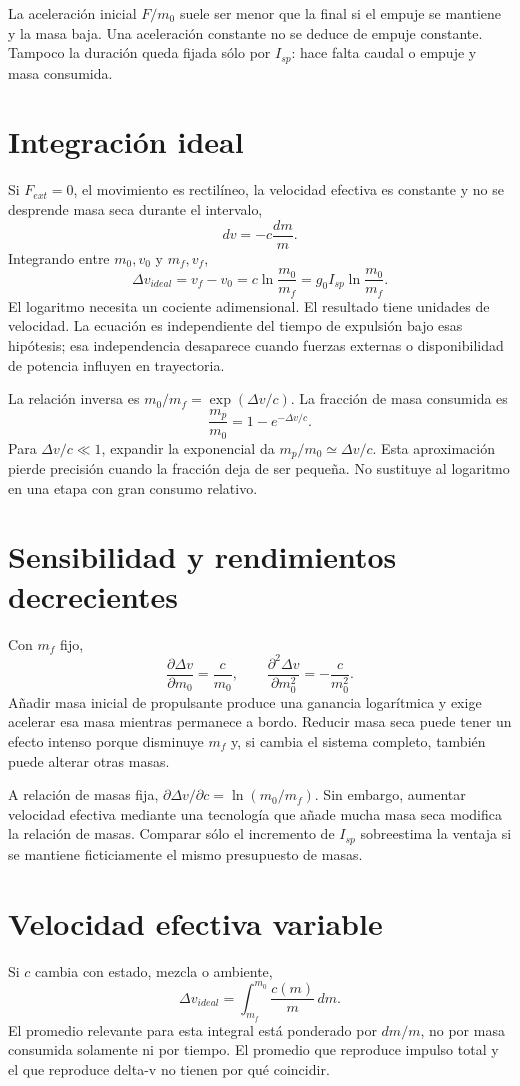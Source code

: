 La aceleración inicial $F/m_0$ suele ser menor que la final si el empuje se mantiene y la masa baja. Una aceleración constante no se deduce de empuje constante. Tampoco la duración queda fijada sólo por $I_{sp}$: hace falta caudal o empuje y masa consumida.
\section{Integración ideal}
Si $F_{ext}=0$, el movimiento es rectilíneo, la velocidad efectiva es constante y no se desprende masa seca durante el intervalo,
\[
 dv=-c\frac{dm}{m}.
\]
Integrando entre $m_0,v_0$ y $m_f,v_f$,
\begin{equation}\label{eq:tsiolkovski}
 \boxed{\Delta v_{ideal}=v_f-v_0=c\ln\frac{m_0}{m_f}
 =g_0I_{sp}\ln\frac{m_0}{m_f}}.
\end{equation}
El logaritmo necesita un cociente adimensional. El resultado tiene unidades de velocidad. La ecuación es independiente del tiempo de expulsión bajo esas hipótesis; esa independencia desaparece cuando fuerzas externas o disponibilidad de potencia influyen en trayectoria.\cite{MIT32,JPL-EP}

La relación inversa es $m_0/m_f=\exp(\Delta v/c)$. La fracción de masa consumida es
\[
 \frac{m_p}{m_0}=1-e^{-\Delta v/c}.
\]
Para $\Delta v/c\ll1$, expandir la exponencial da $m_p/m_0\simeq\Delta v/c$. Esta aproximación pierde precisión cuando la fracción deja de ser pequeña. No sustituye al logaritmo en una etapa con gran consumo relativo.
\section{Sensibilidad y rendimientos decrecientes}
Con $m_f$ fijo,
\[
 \frac{\partial\Delta v}{\partial m_0}=\frac{c}{m_0},\qquad
 \frac{\partial^2\Delta v}{\partial m_0^2}=-\frac{c}{m_0^2}.
\]
Añadir masa inicial de propulsante produce una ganancia logarítmica y exige acelerar esa masa mientras permanece a bordo. Reducir masa seca puede tener un efecto intenso porque disminuye $m_f$ y, si cambia el sistema completo, también puede alterar otras masas.

A relación de masas fija, $\partial\Delta v/\partial c=\ln(m_0/m_f)$. Sin embargo, aumentar velocidad efectiva mediante una tecnología que añade mucha masa seca modifica la relación de masas. Comparar sólo el incremento de $I_{sp}$ sobreestima la ventaja si se mantiene ficticiamente el mismo presupuesto de masas.
\section{Velocidad efectiva variable}
Si $c$ cambia con estado, mezcla o ambiente,
\[
 \Delta v_{ideal}=\int_{m_f}^{m_0}\frac{c(m)}{m}\,dm.
\]
El promedio relevante para esta integral está ponderado por $dm/m$, no por masa consumida solamente ni por tiempo. El promedio que reproduce impulso total y el que reproduce delta-v no tienen por qué coincidir.

